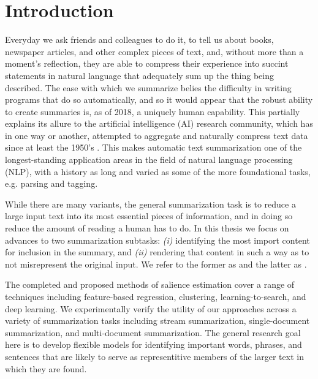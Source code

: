 \section{Introduction}

Everyday we ask friends and colleagues to do it, to tell us about books, 
newspaper articles, and other complex pieces of text, and, without more than a 
moment's reflection, they are able to compress their experience
into succint statements in natural language that adequately sum up the thing
being described. The ease with which we summarize belies the difficulty in 
writing programs that do so automatically, and so it would appear that 
the robust
ability to create summaries is, as of 2018, a uniquely human capability.
This partially explains its allure to the artificial intelligence (AI)
research community, which has in one way or another, attempted to aggregate
and naturally compress text data since at least the 1950's 
\citep{luhn1958automatic}.
This makes automatic text summarization one of the longest-standing 
application areas in the 
field of natural language processing (NLP), with a history as long and varied
as some of the more foundational tasks, e.g. parsing and tagging. 

While there are many variants, 
the general summarization task is 
to reduce a large input text into its most essential pieces of information,
and in doing so reduce the amount of reading a human has to do. 
In this thesis we focus on advances to two summarization subtasks:
\textit{(i)} identifying the most import content for inclusion in the summary, 
and \textit{(ii)}
rendering that content in such a way as to not misrepresent the original 
input. We refer to the former as  and the latter
as . 

The completed and proposed methods of salience estimation cover a range of
techniques including feature-based regression, clustering, learning-to-search,
and deep learning. We experimentally verify the utility of our approaches
across a variety of summarization tasks including stream summarization,
single-document summarization, and multi-document summarization.
The general research goal here is to develop flexible models for 
identifying
important words, phrases, and sentences that are likely to serve as 
representitive members of the larger text in which they are found.

